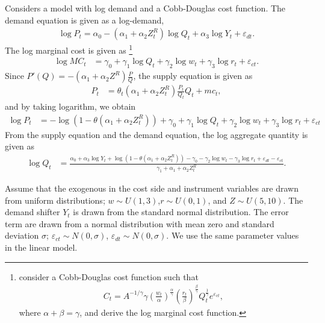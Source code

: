\documentclass[11pt, a4paper]{article}
\begin{document}
Considers a model with log demand and a Cobb-Douglas cost function. 
The demand equation is given as a log-demand, 
\begin{align}
    \log P_{t} = \alpha_0 - (\alpha_1 + \alpha_2 Z^R_t) \log Q_t + \alpha_3 \log Y_t + \varepsilon_{dt}.
\end{align}
The log marginal cost is given as 
\footnote{\cite{hyde1995can} consider a Cobb-Douglas cost function such that \begin{align*}
    C_t = A^{-1/\gamma} \gamma \left(\frac{w_t}{\alpha}\right)^{\frac{\alpha}{\gamma}} \left(\frac{r_t}{\beta}\right)^{\frac{\beta}{\gamma}} Q_t^{\frac{1}{\gamma}}e^{\varepsilon_{ct}},
\end{align*} where $\alpha + \beta = \gamma$, and derive the log marginal cost function.}
\begin{align}
    \log MC_t &= \gamma_0 + \gamma_1 \log Q_t +  \gamma_2 \log w_t + \gamma_3 \log r_t + \varepsilon_{ct}.
\end{align}
Since $P'(Q) = - (\alpha_1 + \alpha_2 Z^R) \frac{P}{Q} $, the supply equation is given as
\begin{align}
    P_t &= \theta_t (\alpha_1 + \alpha_2 Z^R_t) \frac{P_t}{Q_t} Q_t + mc_t,
\end{align}
and by taking logarithm, we obtain
\begin{align}
    \log P_t & = - \log(1 - \theta(\alpha_1 + \alpha_2 Z^R_t)) + \gamma_0 + \gamma_1 \log Q_t +  \gamma_2 \log w_t + \gamma_3 \log r_t + \varepsilon_{ct}
\end{align}
From the supply equation and the demand equation, the log aggregate quantity is given as 
\begin{align}
    \log Q_t &= \frac{ \alpha_0 + \alpha_3 \log Y_t + \log (1 - \theta (\alpha_1 + \alpha_2 Z^R_t)) - \gamma_0  -  \gamma_2 \log w_t - \gamma_3 \log r_t + \varepsilon_{dt} - \varepsilon_{ct}}{\gamma_1+ \alpha_1 + \alpha_2 Z^R_t }.
\end{align}

Assume that the exogenous in the cost side and instrument variables are drawn from uniform distributions; $w \sim U(1,3)$,$r \sim U(0,1)$, and $Z \sim U(5, 10)$. The demand shifter $Y_t$ is drawn from the standard normal distribution.
The error term are drawn from a normal distribution with mean zero and standard deviation $\sigma$; $\varepsilon_{ct}\sim N(0,\sigma)$, $\varepsilon_{dt} \sim N(0,\sigma)$.
We use the same parameter values in the linear model.
\end{document}
